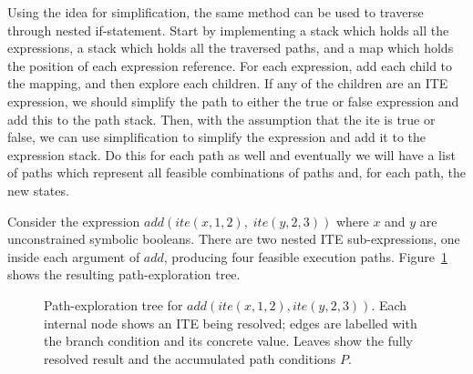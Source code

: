 \documentclass[11pt]{article}
\begin{document}
Using the idea for simplification, the same method can be used to traverse through nested if-statement. Start by implementing a stack which holds all the expressions, a stack which holds all the traversed paths, and a map which holds the position of each expression reference. For each expression, add each child to the mapping, and then explore each children. If any of the children are an ITE expression, we should simplify the path to either the true or false expression and add this to the path stack. Then, with the assumption that the ite is true or false, we can use simplification to simplify the expression and add it to the expression stack. Do this for each path as well and eventually we will have a list of paths which represent all feasible combinations of paths and, for each path, the new states. 

Consider the expression $\mathit{add}(\mathit{ite}(x, 1, 2),\; \mathit{ite}(y, 2, 3))$ where $x$ and $y$ are unconstrained symbolic booleans. There are two nested ITE sub-expressions, one inside each argument of $\mathit{add}$, producing four feasible execution paths. Figure~\ref{fig:nested-ite-tree} shows the resulting path-exploration tree.

\begin{figure}[H]
    \centering
    \caption{Path-exploration tree for $\mathit{add}(\mathit{ite}(x,1,2),\mathit{ite}(y,2,3))$. Each internal node shows an ITE being resolved; edges are labelled with the branch condition and its concrete value. Leaves show the fully resolved result and the accumulated path conditions $P$.}
    \label{fig:nested-ite-tree}
\end{figure}
\end{document}
